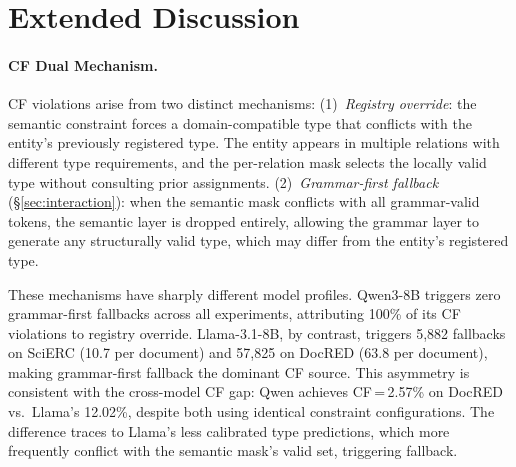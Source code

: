 
\section{Extended Discussion}\label{app:discussion}


\paragraph{CF Dual Mechanism.}
CF violations arise from two distinct mechanisms:
(1)~\emph{Registry override}: the semantic constraint forces a domain-compatible type that conflicts with the entity's previously registered type.
The entity appears in multiple relations with different type requirements, and the per-relation mask selects the locally valid type without consulting prior assignments.
(2)~\emph{Grammar-first fallback} (\S\ref{sec:interaction}): when the semantic mask conflicts with all grammar-valid tokens, the semantic layer is dropped entirely, allowing the grammar layer to generate any structurally valid type, which may differ from the entity's registered type.

These mechanisms have sharply different model profiles.
Qwen3-8B triggers zero grammar-first fallbacks across all experiments, attributing 100\% of its CF violations to registry override.
Llama-3.1-8B, by contrast, triggers 5{,}882 fallbacks on SciERC (10.7 per document) and 57{,}825 on DocRED (63.8 per document), making grammar-first fallback the dominant CF source.
This asymmetry is consistent with the cross-model CF gap: Qwen achieves CF\,=\,2.57\% on DocRED vs.\ Llama's 12.02\%, despite both using identical constraint configurations.
The difference traces to Llama's less calibrated type predictions, which more frequently conflict with the semantic mask's valid set, triggering fallback.


